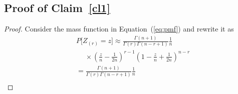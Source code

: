 \documentclass[12pt]{article}
\theoremstyle{plain}
\begin{document}
\begin{appendix}
\section{Proof of Claim~\ref{cl1}}\label{appB}


\begin{proof}
Consider the mass function in Equation~(\ref{eq:pmf}) and rewrite it as
\begin{align*}
	&P\bigg[ Z_{(r)} = z \bigg] \approx \frac{\Gamma(n+1)}{\Gamma(r)\Gamma(n - r + 1)} \frac{1}{n}  \\
	&\hspace{15pt} \times  \left(\frac{z}{n} - \frac{1}{2n}\right)^{r-1} \left(1-\frac{z}{n} + \frac{1}{2n}\right)^{n-r}\\
	&= \frac{\Gamma(n+1)}{\Gamma(r)\Gamma(n - r + 1)} \frac{1}{n}  \\

\end{align*}
\end{proof}
\end{appendix}
\end{document}
